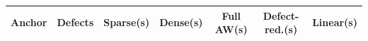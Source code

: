 \begin{tabular}{lcccccc}
\toprule
Anchor & Defects & Sparse(s) & Dense(s) & Full AW(s) & Defect-red.(s) & Linear(s) \\
\midrule
\bottomrule
\end{tabular}
